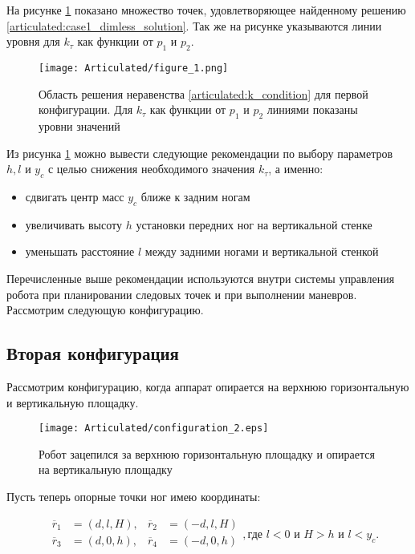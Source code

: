 На рисунке \ref{articulated:fig:case1_dimless_solution} показано множество точек, удовлетворяющее найденному решению \ref{articulated:case1_dimless_solution}. Так же на рисунке указываются линии уровня для $k_\tau$ как функции от $p_1$ и $p_2$.

\begin{figure}[ht]
  \centering
  \texttt{[image: Articulated/figure\_1.png]}
  \caption{Область решения неравенства \ref{articulated:k_condition} для первой конфигурации. Для $k_\tau$ как функции от $p_1$ и $p_2$ линиями показаны уровни значений}
  \label{articulated:fig:case1_dimless_solution}
\end{figure}

Из рисунка \ref{articulated:fig:case1_dimless_solution} можно вывести следующие рекомендации по выбору параметров $h,l$ и $y_c$ с целью снижения необходимого значения $k_\tau$, а именно:

\begin{itemize}
  \item сдвигать центр масс $y_c$ ближе к задним ногам
  \item увеличивать высоту $h$ установки передних ног на вертикальной стенке
  \item уменьшать расстояние $l$ между задними ногами и вертикальной стенкой
\end{itemize}

Перечисленные выше рекомендации используются внутри системы управления робота при планировании следовых точек и при выполнении маневров. Рассмотрим следующую конфигурацию.



\subsection{Вторая конфигурация}
\label{articulated:case_2}

Рассмотрим конфигурацию, когда аппарат опирается на верхнюю горизонтальную и вертикальную площадку.

\begin{figure}[ht]
  \centering
  \texttt{[image: Articulated/configuration\_2.eps]}
  \caption{Робот зацепился за верхнюю горизонтальную площадку и опирается на вертикальную площадку}
\end{figure}

Пусть теперь опорные точки ног имею координаты:

\begin{equation}
\label{articulated:case2_step_points}
\begin{alignedat}{3}
&\overline{r}_1 &= (d, l, H) , &\overline{r}_2 &= (-d, l, H) \\
&\overline{r}_3 &= (d, 0, h) , &\overline{r}_4 &= (-d, 0, h) \\
\end{alignedat}, \text{где $l < 0$ и $H > h$ и $l < y_c$.}
\end{equation}

